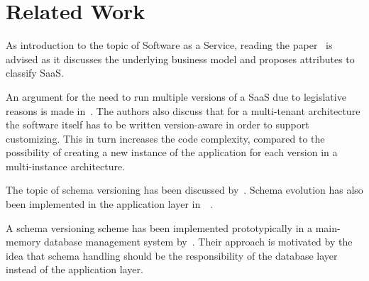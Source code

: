 \section{Related Work}
\label{sec:relatedwork}

As introduction to the topic of Software as a Service, reading the paper~\cite{Chong2006a} is advised as it discusses the underlying business model and proposes attributes to classify SaaS.

An argument for the need to run multiple versions of a SaaS due to legislative reasons is made in~\cite{Bezemer2010}. The authors also discuss that for a multi-tenant architecture the software itself has to be written version-aware in order to support customizing. This in turn increases the code complexity, compared to the possibility of creating a new instance of the application for each version in a multi-instance architecture.

The topic of schema versioning has been discussed by~\cite{roddick1995survey}. Schema evolution has also been implemented in the application layer in~\cite{Weissman2009}~\cite{Keddo}.

A schema versioning scheme has been implemented prototypically in a main-memory database management system by~\cite{Aulbach2011}. Their approach is motivated by the idea that schema handling should be the responsibility of the database layer instead of the application layer.

